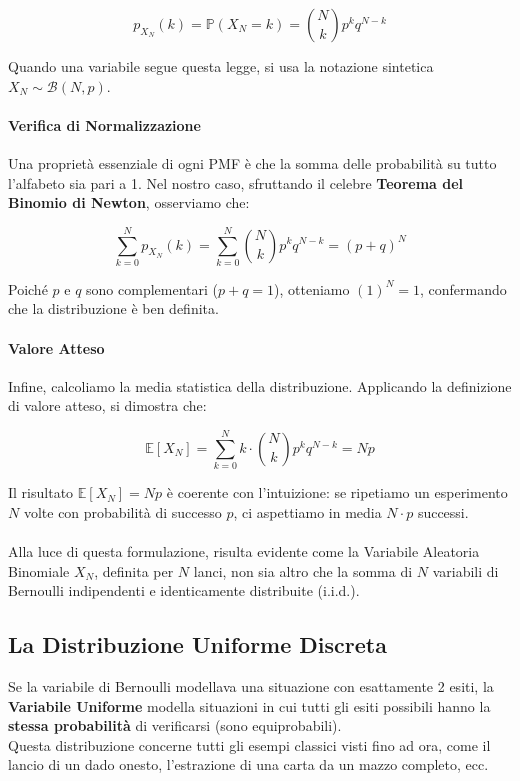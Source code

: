 \begin{equation}
\boxed{p_{X_N}(k) = \mathbb{P}(X_N = k) = \binom{N}{k} p^k q^{N-k}}
\end{equation}

Quando una variabile segue questa legge, si usa la notazione sintetica $X_N \sim \mathcal{B}(N, p)$.

\paragraph{Verifica di Normalizzazione}
Una proprietà essenziale di ogni PMF è che la somma delle probabilità su tutto l'alfabeto sia pari a 1. Nel nostro caso, sfruttando il celebre \textbf{Teorema del Binomio di Newton}, osserviamo che:

\[
\sum_{k=0}^{N} p_{X_N}(k) = \sum_{k=0}^{N} \binom{N}{k} p^k q^{N-k} = (p + q)^N
\]

Poiché $p$ e $q$ sono complementari ($p+q=1$), otteniamo $(1)^N = 1$, confermando che la distribuzione è ben definita.

\paragraph{Valore Atteso}
Infine, calcoliamo la media statistica della distribuzione. Applicando la definizione di valore atteso, si dimostra che:

\begin{equation}
\mathbb{E}[X_N] = \sum_{k=0}^{N} k \cdot \binom{N}{k} p^k q^{N-k} = Np
\end{equation}

Il risultato $\mathbb{E}[X_N] = Np$ è coerente con l'intuizione: se ripetiamo un esperimento $N$ volte con probabilità di successo $p$, ci aspettiamo in media $N \cdot p$ successi.
\\\\Alla luce di questa formulazione, risulta evidente come la Variabile Aleatoria Binomiale $X_N$, definita per $N$ lanci, non sia altro che la somma di $N$ variabili di Bernoulli indipendenti e identicamente distribuite (i.i.d.).

\subsection{La Distribuzione Uniforme Discreta}

Se la variabile di Bernoulli modellava una situazione con esattamente 2 esiti, la \textbf{Variabile Uniforme} modella situazioni in cui tutti gli esiti possibili hanno la \textbf{stessa probabilità} di verificarsi (sono equiprobabili).
\\Questa distribuzione concerne tutti gli esempi classici visti fino ad ora, come il lancio di un dado onesto, l'estrazione di una carta da un mazzo completo, ecc.


